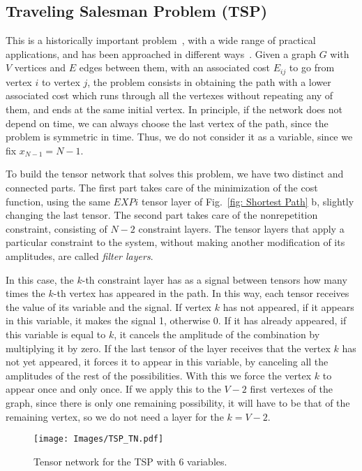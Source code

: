 \subsection{Traveling Salesman Problem (TSP)}\label{ssec: TSP}
This is a historically important problem~\cite{TSP_overview,TSP_General}, with a wide range of practical applications, and has been approached in different ways~\cite{TSP,TSP2,TSP_TN,QUBO_TSP}. Given a graph $G$ with $V$ vertices and $E$ edges between them, with an associated cost $E_{ij}$ to go from vertex $i$ to vertex $j$, the problem consists in obtaining the path with a lower associated cost which runs through all the vertexes without repeating any of them, and ends at the same initial vertex. In principle, if the network does not depend on time, we can always choose the last vertex of the path, since the problem is symmetric in time. Thus, we do not consider it as a variable, since we fix $x_{N-1}=N-1$.

To build the tensor network that solves this problem, we have two distinct and connected parts. The first part takes care of the minimization of the cost function, using the same $EXPi$ tensor layer of Fig.~\ref{fig: Shortest Path} b, slightly changing the last tensor. The second part takes care of the nonrepetition constraint, consisting of $N-2$ constraint layers. The tensor layers that apply a particular constraint to the system, without making another modification of its amplitudes, are called \textit{filter layers}.

In this case, the $k$-th constraint layer has as a signal between tensors how many times the $k$-th vertex has appeared in the path. In this way, each tensor receives the value of its variable and the signal. If vertex $k$ has not appeared, if it appears in this variable, it makes the signal 1, otherwise 0. If it has already appeared, if this variable is equal to $k$, it cancels the amplitude of the combination by multiplying it by zero. If the last tensor of the layer receives that the vertex $k$ has not yet appeared, it forces it to appear in this variable, by canceling all the amplitudes of the rest of the possibilities. With this we force the vertex $k$ to appear once and only once. If we apply this to the $V-2$ first vertexes of the graph, since there is only one remaining possibility, it will have to be that of the remaining vertex, so we do not need a layer for the $k=V-2$.
\begin{figure}
    \centering
    \texttt{[image: Images/TSP\_TN.pdf]}
    \caption{Tensor network for the TSP with 6 variables.}
    \label{fig: TSP TN}
\end{figure}

